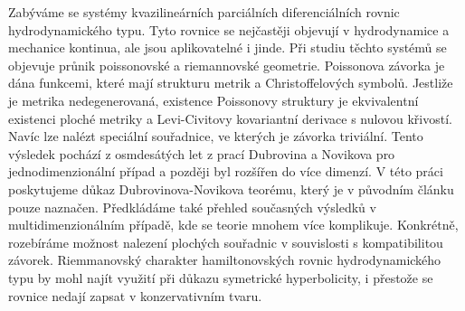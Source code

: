 \documentclass[12pt]{report}
\begin{document}

Zabýváme se systémy kvazilineárních parciálních diferenciálních rovnic hydrodynamického typu. Tyto rovnice se nejčastěji objevují v hydrodynamice a mechanice kontinua, ale jsou aplikovatelné i jinde. Při studiu těchto systémů se objevuje průnik poissonovské a riemannovské geometrie. Poissonova závorka je dána funkcemi, které mají strukturu metrik a Christoffelových symbolů. Jestliže je metrika nedegenerovaná, existence Poissonovy struktury je ekvivalentní existenci ploché metriky a Levi-Civitovy kovariantní derivace s nulovou křivostí. Navíc lze nalézt speciální souřadnice, ve kterých je závorka triviální. Tento výsledek pochází z osmdesátých let z prací Dubrovina a Novikova pro jednodimenzionální případ a později byl rozšířen do více dimenzí. V této práci poskytujeme důkaz Dubrovinova-Novikova teorému, který je v původním článku pouze naznačen. Předkládáme také přehled současných výsledků v multidimenzionálním případě, kde se teorie mnohem více komplikuje. Konkrétně, rozebíráme možnost nalezení plochých souřadnic v souvislosti s kompatibilitou závorek. Riemmanovský charakter hamiltonovských rovnic hydrodynamického typu by mohl najít využití při důkazu symetrické hyperbolicity, i přestože se rovnice nedají zapsat v konzervativním tvaru.
\end{document}
